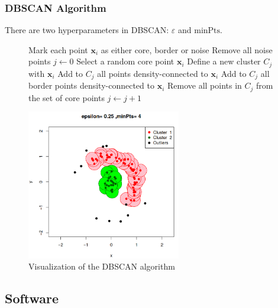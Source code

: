 \subsubsection{DBSCAN Algorithm}

\begin{marker}
There are two hyperparameters in DBSCAN: $\varepsilon$ and $\text{minPts}$.
\end{marker}

\begin{figure}[H]
\begin{algorithmic}[1] %
        \State Mark each point $\boldsymbol{x}_i$ as either core, border or noise
        \State Remove all noise points
        \State $j \gets 0$
            \State Select a random core point $\boldsymbol{x}_i$
            \State Define a new cluster $C_j$ with $\boldsymbol{x}_i$
            \State Add to $C_j$ all points density-connected to $\boldsymbol{x}_i$
            \State Add to $C_j$ all border points density-connected to $\boldsymbol{x}_i$
            \State Remove all points in $C_j$ from the set of core points
            \State $j \gets j + 1$
        \EndWhile
    \EndProcedure
\end{algorithmic}
\end{figure}

\begin{figure}[H]
    \includegraphics[width=0.6\textwidth]{../figures/dbscan_eps_minpts}
    \caption{Visualization of the DBSCAN algorithm}
\end{figure}

\subsection{Software}

